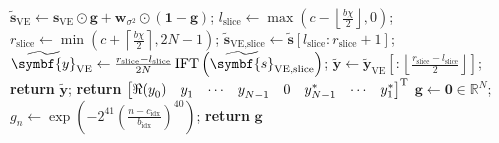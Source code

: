 \begin{algorithm}
\begin{algorithmic}
            \EndFor
            \State $\widetilde{\symbf{s}}_{\text{VE}} \gets \symbf{s}_{\text{VE}} \odot \symbf{g} + \symbf{w}_{\sigma^2} \odot \left(\symbf{1} - \symbf{g}\right)$;
            \State $l_{\text{slice}} \gets \max\left( c - \left \lfloor \frac{b \chi}{2} \right \rfloor, 0 \right)$;
            \State $r_{\text{slice}} \gets \min\left( c + \left \lceil \frac{b \chi}{2} \right \rceil, 2N - 1 \right)$;
            \State $\widetilde{\symbf{s}}_{\text{VE,slice}} \gets \widetilde{\symbf{s}} [l_{\text{slice}} : r_{\text{slice}} + 1]$;
            \State $\widetilde{\symbf{y}}_{\text{VE}} \gets
                \frac{r_{\text{slice}} - l_{\text{slice}}}{2N} \IFT \left(
                \widetilde{\symbf{s}}_{\text{VE,slice}} \right)$;
            \State $\widetilde{\symbf{y}} \gets \widetilde{\symbf{y}}_{\text{VE}}
                \left[:\left \lfloor \frac{r_{\text{slice}} - l_{\text{slice}}}{2}\right \rfloor \right]$;
            \State \textbf{return} $\widetilde{\symbf{y}}$;
        \EndProcedure
        \Statex
            \State \textbf{return} $
            \begin{bmatrix}
                \Re(y_0^{\vphantom{*}}) & y_1^{\vphantom{*}} & \cdots & y_{N-1}^{\vphantom{*}} & 0 & y_{N-1}^* & \cdots & y_1^*
            \end{bmatrix}^{\mathrm{T}}
            $
        \EndProcedure
        \Statex
            \State $\symbf{g} \gets \symbf{0} \in \mathbb{R}^{N}$;
                \State $g_n \gets \exp\left(
                    -2^{41} \left(
                        \frac{n - c_{\text{idx}}}{b_{\text{idx}}}
                    \right)^{40}
                    \right)
                $;
            \EndFor
            \State \textbf{return} $\symbf{g}$
        \EndProcedure
    \end{algorithmic}
\end{algorithm}
